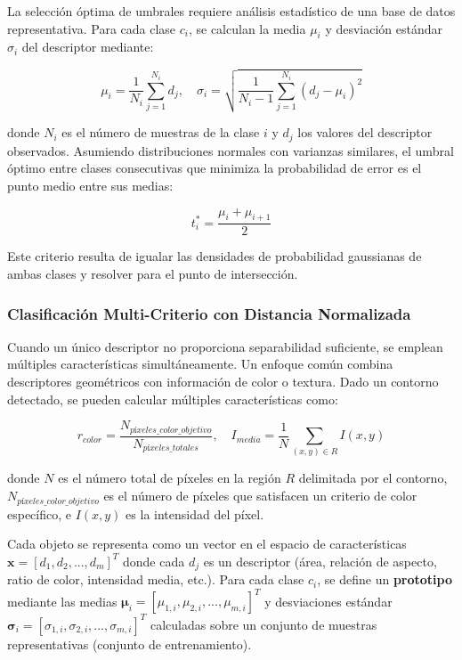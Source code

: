 La selección óptima de umbrales requiere análisis estadístico de una base de datos representativa. Para cada clase $c_i$, se calculan la media $\mu_i$ y desviación estándar $\sigma_i$ del descriptor mediante:

\begin{equation}
\mu_i = \frac{1}{N_i}\sum_{j=1}^{N_i} d_j, \quad \sigma_i = \sqrt{\frac{1}{N_i-1}\sum_{j=1}^{N_i}(d_j - \mu_i)^2}
\end{equation}

donde $N_i$ es el número de muestras de la clase $i$ y $d_j$ los valores del descriptor observados. Asumiendo distribuciones normales con varianzas similares, el umbral óptimo entre clases consecutivas que minimiza la probabilidad de error es el punto medio entre sus medias:

\begin{equation}
t_i^* = \frac{\mu_i + \mu_{i+1}}{2}
\end{equation}

Este criterio resulta de igualar las densidades de probabilidad gaussianas de ambas clases y resolver para el punto de intersección.

\subsubsection{Clasificación Multi-Criterio con Distancia Normalizada}

Cuando un único descriptor no proporciona separabilidad suficiente, se emplean múltiples características simultáneamente. Un enfoque común combina descriptores geométricos con información de color o textura. Dado un contorno detectado, se pueden calcular múltiples características como:

\begin{equation}
r_{color} = \frac{N_{píxeles\_color\_objetivo}}{N_{píxeles\_totales}}, \quad I_{media} = \frac{1}{N}\sum_{(x,y) \in R} I(x,y)
\end{equation}

donde $N$ es el número total de píxeles en la región $R$ delimitada por el contorno, $N_{píxeles\_color\_objetivo}$ es el número de píxeles que satisfacen un criterio de color específico, e $I(x,y)$ es la intensidad del píxel.

Cada objeto se representa como un vector en el espacio de características $\mathbf{x} = [d_1, d_2, ..., d_m]^T$ donde cada $d_j$ es un descriptor (área, relación de aspecto, ratio de color, intensidad media, etc.). Para cada clase $c_i$, se define un \textbf{prototipo} mediante las medias $\boldsymbol{\mu}_i = [\mu_{1,i}, \mu_{2,i}, ..., \mu_{m,i}]^T$ y desviaciones estándar $\boldsymbol{\sigma}_i = [\sigma_{1,i}, \sigma_{2,i}, ..., \sigma_{m,i}]^T$ calculadas sobre un conjunto de muestras representativas (conjunto de entrenamiento).

